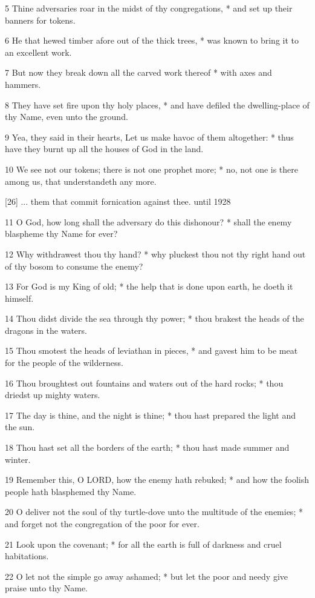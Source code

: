 5 Thine adversaries roar in the midst of thy congregations,
* and set up their banners for tokens.

6 He that hewed timber afore out of the thick trees,
* was known to bring it to an excellent work.

7 But now they break down all the carved work thereof
* with axes and hammers.

8 They have set fire upon thy holy places, * and have
defiled the dwelling-place of thy Name, even unto the ground.

9 Yea, they said in their hearts, Let us make havoc
of them altogether: * thus have they burnt up all the houses of God in
the land.

10 We see not our tokens; there is not one prophet
more; * no, not one is there among us, that understandeth any more.

[26] ... them that commit
fornication against thee.
until 1928

11 O
God, how long shall the adversary do this dishonour? * shall the enemy
blaspheme thy Name for ever?

12 Why withdrawest thou thy hand? * why pluckest thou
not thy right hand out of thy bosom to consume the enemy?

13 For God is my King of old; * the help that is done
upon earth, he doeth it himself.

14 Thou didst divide the sea through thy power; * thou
brakest the heads of the dragons in the waters.

15 Thou smotest the heads of leviathan in pieces, *
and gavest him to be meat for the people of the wilderness.

16 Thou broughtest out fountains and waters out of
the hard rocks; * thou driedst up mighty waters.

17 The day is thine, and the night is thine; * thou
hast prepared the light and the sun.

18 Thou hast set all the borders of the earth; * thou
hast made summer and winter.

19 Remember this, O LORD, how the enemy hath rebuked;
* and how the foolish people hath blasphemed thy Name.

20 O deliver not the soul of thy turtle-dove unto the
multitude of the enemies; * and forget not the congregation of the poor
for ever.

21 Look upon the covenant; * for all the earth is full
of darkness and cruel habitations.

22 O let not the simple go away ashamed; * but let
the poor and needy give praise unto thy Name.

